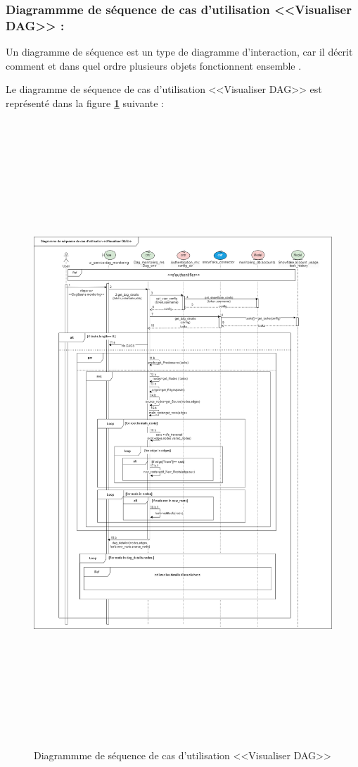 \subsubsection{Diagrammme de séquence de cas d'utilisation <<Visualiser DAG>> :}
\par Un diagramme de séquence est un type de diagramme d'interaction, car il décrit comment et dans quel ordre plusieurs objets fonctionnent ensemble \cite{seq}.
\par Le diagramme de séquence de cas d'utilisation <<Visualiser DAG>> est représenté dans la figure \textbf{\ref{fig :seq1}} suivante :
    \begin{figure}[H]
        \centering
        \includegraphics[width =1\linewidth, height=23.5cm]{img/conception/seq1.png}
        \caption{Diagrammme de séquence de cas d'utilisation <<Visualiser DAG>> }
            \label{fig :seq1}
    \end{figure}

